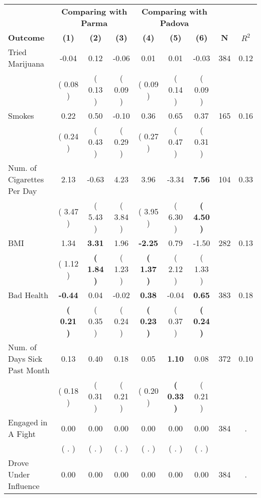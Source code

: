 \begin{tabular}{lcccccccc}
\toprule
 & \multicolumn{3}{c}{\textbf{Comparing with Parma}} & \multicolumn{3}{c}{\textbf{Comparing with Padova}} & \\
\cmidrule(lr){2-4} \cmidrule(lr){5-7} 
 \textbf{Outcome} & \textbf{(1)} & \textbf{(2)} & \textbf{(3)} & \textbf{(4)} & \textbf{(5)} & \textbf{(6)} & \textbf{N} & \textbf{$ R^2$} \\
\midrule
Tried Marijuana &     -0.04 &      0.12 &     -0.06 &      0.01 &      0.01 &     -0.03 & 384 &       0.12 \\ 
 & (     0.08 ) & (     0.13 ) & (     0.09 ) & (     0.09 ) & (     0.14 ) & (     0.09 ) & \\
Smokes &      0.22 &      0.50 &     -0.10 &      0.36 &      0.65 &      0.37 & 165 &       0.16 \\ 
 & (     0.24 ) & (     0.43 ) & (     0.29 ) & (     0.27 ) & (     0.47 ) & (     0.31 ) & \\
Num. of Cigarettes Per Day &      2.13 &     -0.63 &      4.23 &      3.96 &     -3.34 & \textbf{     7.56} & 104 &       0.33 \\ 
 & (     3.47 ) & (     5.43 ) & (     3.84 ) & (     3.95 ) & (     6.30 ) & \textbf{(     4.50 )} & \\
BMI &      1.34 & \textbf{     3.31} &      1.96 & \textbf{    -2.25} &      0.79 &     -1.50 & 282 &       0.13 \\ 
 & (     1.12 ) & \textbf{(     1.84 )} & (     1.23 ) & \textbf{(     1.37 )} & (     2.12 ) & (     1.33 ) & \\
Bad Health & \textbf{    -0.44} &      0.04 &     -0.02 & \textbf{     0.38} &     -0.04 & \textbf{     0.65} & 383 &       0.18 \\ 
 & \textbf{(     0.21 )} & (     0.35 ) & (     0.24 ) & \textbf{(     0.23 )} & (     0.37 ) & \textbf{(     0.24 )} & \\
Num. of Days Sick Past Month &      0.13 &      0.40 &      0.18 &      0.05 & \textbf{     1.10} &      0.08 & 372 &       0.10 \\ 
 & (     0.18 ) & (     0.31 ) & (     0.21 ) & (     0.20 ) & \textbf{(     0.33 )} & (     0.21 ) & \\
Engaged in A Fight &      0.00 &      0.00 &      0.00 &      0.00 &      0.00 &      0.00 & 384 &          . \\ 
 & (        . ) & (        . ) & (        . ) & (        . ) & (        . ) & (        . ) & \\
Drove Under Influence &      0.00 &      0.00 &      0.00 &      0.00 &      0.00 &      0.00 & 384 &          . \\ 

\end{tabular}
